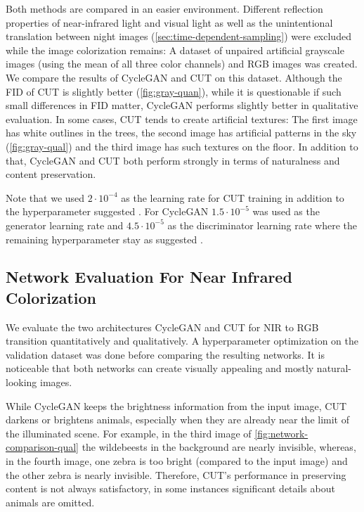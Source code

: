 \documentclass[a4paper,11pt, DIV=12]{scrartcl}
\begin{document}
Both methods are compared in an easier environment.
Different reflection properties of near-infrared light and visual light as well as the unintentional translation between night images (\autoref{sec:time-dependent-sampling}) were excluded while the image colorization remains:
A dataset of unpaired artificial grayscale images (using the mean of all three color channels) and RGB images was created.
We compare the results of CycleGAN and CUT on this dataset.
Although the FID of CUT is slightly better (\autoref{fig:gray-quan}), while it is questionable if such small differences in FID matter, CycleGAN performs slightly better in qualitative evaluation.
In some cases, CUT tends to create artificial textures: The first image has white outlines in the trees, the second image has artificial patterns in the sky (\autoref{fig:gray-qual}) and the third image has such textures on the floor.
In addition to that, CycleGAN and CUT both perform strongly in terms of naturalness and content preservation.

Note that we used $2\cdot10^{-4}$ as the learning rate for CUT training in addition to the hyperparameter suggested \cite{cut}.
For CycleGAN $1.5\cdot10^{-5}$ was used as the generator learning rate and $4.5\cdot10^{-5}$ as the discriminator learning rate where the remaining hyperparameter stay as suggested \cite{mehri2019colorizing}.

\subsection{Network Evaluation For Near Infrared Colorization}
\label{sec:network-comparison}
We evaluate the two architectures CycleGAN and CUT for NIR to RGB transition quantitatively and qualitatively.
A hyperparameter optimization on the validation dataset was done before comparing the resulting networks.
It is noticeable that both networks can create visually appealing and mostly natural-looking images.

While CycleGAN keeps the brightness information from the input image, CUT darkens or brightens animals, especially when they are already near the limit of the illuminated scene.
For example, in the third image of \autoref{fig:network-comparison-qual} the wildebeests in the background are nearly invisible, whereas, in the fourth image, one zebra is too bright (compared to the input image)
and the other zebra is nearly invisible. Therefore, CUT's performance in preserving content is not always satisfactory, in some instances significant details about animals are omitted.
\end{document}

